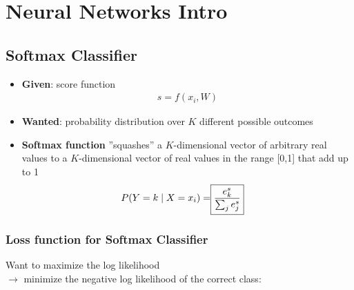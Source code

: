 \documentclass{scrartcl}
\begin{document}
\pagebreak
\section{Neural Networks Intro}

\subsection{Softmax Classifier}

\begin{itemize}
	\item \textbf{Given}: score function
	\begin{align*}
		s=f(x_i,W)
	\end{align*}
	\item \textbf{Wanted}: probability distribution over $ K $ different possible outcomes
	\item \textbf{Softmax function} ''squashes'' a $ K $-dimensional vector of
	 arbitrary real values to a $ K $-dimensional vector of real values in the range [0,1] that add up to 1
	\begin{align*}
		P(Y=k \mid X=x_i)=\Aboxed{\frac{e^s_{k}}{\sum_j e^s_{j}}}
	\end{align*}
\end{itemize}

\subsubsection{Loss function for Softmax Classifier}

Want to maximize the log likelihood \\
$ \rightarrow $ minimize the negative log likelihood of the correct class:
\end{document}
